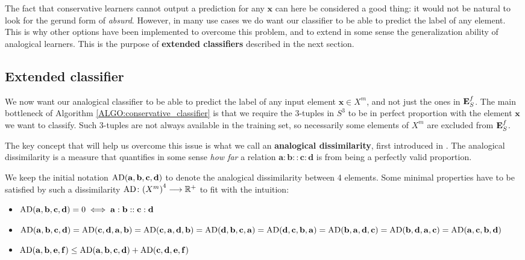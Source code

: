 The fact that conservative learners cannot output a prediction for any
$\mathbf{x}$ can here be considered a good thing: it would not be natural to
look for the gerund form of \textit{absurd}. However, in many use cases we do
want our classifier to be able to predict the label of any element. This is why
other options have been implemented to overcome this problem, and to extend in
some sense the generalization ability of analogical learners. This is the
purpose of \textbf{extended classifiers} described in the next section.

\subsection{Extended classifier}
\label{SEC:extended_classifier}

We now want our analogical classifier to be able to predict the label of any
input element $\mathbf{x} \in X^m$, and not just the ones in $\mathbf{E}_{S}^{f}$.
The main bottleneck of Algorithm \ref{ALGO:conservative_classifier} is that we
require the 3-tuples in $S^3$ to be in perfect proportion with the element
$\mathbf{x}$ we want to classify. Such 3-tuples are not always available in the
training set, so necessarily some elements of $X^m$ are excluded from $\mathbf{E}_{S}^{f}$.

The key concept that will help us overcome this issue is what we call an
\textbf{analogical dissimilarity}, first introduced in
\cite{BayMicDelIJCAI07}. The analogical dissimilarity is a measure that
quantifies in some sense \textit{how far} a relation $\mathbf{a} : \mathbf{b}
:: \mathbf{c} : \mathbf{d}$ is from being a perfectly valid proportion.

We keep the initial notation $\text{AD}(\mathbf{a}, \mathbf{b},
\mathbf{c},\mathbf{d})$ to denote the analogical dissimilarity between 4
elements.  Some  minimal properties have to be satisfied by such a
dissimilarity $\text{AD} \colon {(X^m)}^4 \longrightarrow \mathbb{R}^+$ to fit
with the intuition:
\begin{itemize}
  \item $\text{AD}(\mathbf{a}, \mathbf{b},\mathbf{c},\mathbf{d})=0 \iff \mathbf{a} :
    \mathbf{b}:: \mathbf{c} : \mathbf{d}$
  \item $\text{AD}(\mathbf{a}, \mathbf{b},\mathbf{c},\mathbf{d})=
    \text{AD}(\mathbf{c}, \mathbf{d},\mathbf{a},\mathbf{b})=
    \text{AD}(\mathbf{c}, \mathbf{a},\mathbf{d},\mathbf{b})=
    \text{AD}(\mathbf{d}, \mathbf{b},\mathbf{c},\mathbf{a})=
    \text{AD}(\mathbf{d}, \mathbf{c},\mathbf{b},\mathbf{a})=
    \text{AD}(\mathbf{b}, \mathbf{a},\mathbf{d},\mathbf{c})=
    \text{AD}(\mathbf{b}, \mathbf{d},\mathbf{a},\mathbf{c})=
    \text{AD}(\mathbf{a}, \mathbf{c},\mathbf{b},\mathbf{d})
    $
  \item $\text{AD}(\mathbf{a}, \mathbf{b},\mathbf{e},\mathbf{f}) \leq \text{AD}(\mathbf{a},
    \mathbf{b},\mathbf{c},\mathbf{d}) + \text{AD}(\mathbf{c},
    \mathbf{d},\mathbf{e},\mathbf{f})$
\end{itemize}

